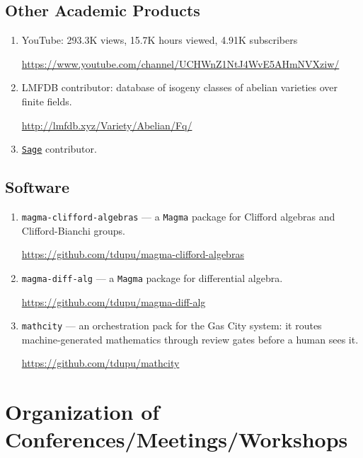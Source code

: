 \documentclass[a4paper,10pt]{article}
\begin{document}
\subsection*{Other Academic Products}
\begin{enumerate}
	\item YouTube: 293.3K views, 15.7K hours viewed, 4.91K subscribers
	\begin{center}
		 \url{https://www.youtube.com/channel/UCHWnZ1NtJ4WvE5AHmNVXziw/}
	\end{center}
	\item LMFDB contributor: database of isogeny classes of abelian varieties over finite fields.
	 \begin{center}
	 	\url{http://lmfdb.xyz/Variety/Abelian/Fq/}
	 \end{center}
	\item \href{https://www.sagemath.org/}{\texttt{Sage}} contributor. 
			\

\end{enumerate}

\subsection*{Software}
\begin{enumerate}
	\item \texttt{magma-clifford-algebras} --- a \texttt{Magma} package for Clifford algebras and Clifford-Bianchi groups.
	\begin{center}
		\url{https://github.com/tdupu/magma-clifford-algebras}
	\end{center}
	\item \texttt{magma-diff-alg} --- a \texttt{Magma} package for differential algebra.
	\begin{center}
		\url{https://github.com/tdupu/magma-diff-alg}
	\end{center}
	\item \texttt{mathcity} --- an orchestration pack for the Gas City system: it routes machine-generated mathematics through review gates before a human sees it.
	\begin{center}
		\url{https://github.com/tdupu/mathcity}
	\end{center}
\end{enumerate}

\section*{Organization of Conferences/Meetings/Workshops}
\end{document}
